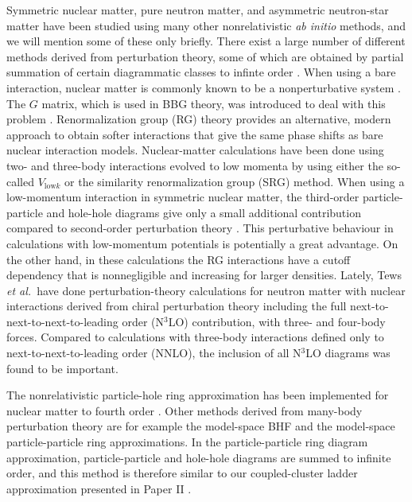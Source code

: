 \documentclass[a4paper,12pt]{report}
\begin{document}
Symmetric nuclear matter, pure neutron matter, and 
asymmetric neutron-star matter have been 
studied using many other nonrelativistic \emph{ab initio}
methods, and we will mention some of these only briefly.
There exist a large number of different methods derived from 
perturbation theory, some of which are obtained by partial
summation of certain diagrammatic classes to infinte order 
\cite{harris}. When using a bare interaction, nuclear 
matter is commonly known to be a nonperturbative system
\cite{bogner2005}. The $G$ matrix, which is used in BBG 
theory, was introduced to deal with this problem 
\cite{day1967}. Renormalization group (RG) theory provides 
an alternative, modern approach 
to obtain softer interactions that give the same phase 
shifts as bare nuclear interaction models. Nuclear-matter
calculations have been done \cite{bogner2005,bogner2010,
hebeler2010,hebeler2011,furnstahl2013} using two- and three-body 
interactions evolved to low momenta by using either the 
so-called $V_{\text{low} k}$ or the similarity renormalization 
group (SRG) method. When using a low-momentum interaction 
in symmetric nuclear matter,
the third-order particle-particle and hole-hole diagrams      
give only a small additional contribution compared to 
second-order perturbation theory \cite{hebeler2011}.
This perturbative behaviour in calculations with 
low-momentum potentials is potentially a great advantage.
On the other hand, in these calculations the RG interactions 
have a cutoff dependency that is nonnegligible and 
increasing for larger densities. Lately, Tews 
\emph{et al.}~have done \cite{tews} perturbation-theory 
calculations 
for neutron matter with nuclear interactions derived 
from chiral perturbation theory including the full 
next-to-next-to-next-to-leading order (N$^{3}$LO) 
contribution, with three- and four-body forces. 
Compared to calculations with three-body interactions
defined only to next-to-next-to-leading order (NNLO), the
inclusion of all N$^{3}$LO diagrams was found to be 
important.

The nonrelativistic particle-hole ring approximation has 
been implemented for nuclear matter to fourth order 
\cite{dickhoff1982}. Other methods derived from many-body 
perturbation theory are for example the model-space BHF
\cite{ma1983,kuo1986,engvik1997a} and the model-space 
particle-particle ring \cite{song1987,jiang1988,engvik1997a,
siu2009} approximations. In the particle-particle ring diagram
approximation, particle-particle and hole-hole diagrams
are summed to infinite order, and this method is therefore
similar to our coupled-cluster ladder approximation 
presented in Paper II \cite{baardsen}. 
\end{document}
